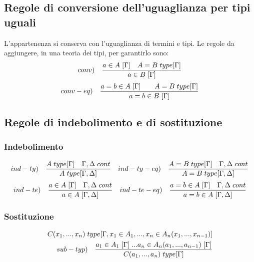 \subsection{Regole di conversione dell'uguaglianza per tipi uguali}
\label{subsec:conversione-uguaglianza}
L'appartenenza si conserva con l'uguaglianza di termini e tipi. Le regole da aggiungere, in una teoria dei tipi, per garantirlo sono:
\[ conv) \quad \frac{a \in A\hspace{0.1cm}[\Gamma] \quad A=B\hspace{0.1cm}type[\Gamma]}{a \in B\hspace{0.1cm}[\Gamma]} \]
\[ conv-eq) \quad \frac{a=b \in A\hspace{0.1cm}[\Gamma] \qquad A=B\hspace{0.1cm}type[\Gamma]}{a=b \in B\hspace{0.1cm}[\Gamma]} \]
\subsection{Regole di indebolimento e di sostituzione}
\label{subsec:indebolimento-sostituzione}
\subsubsection{Indebolimento}
\label{subsec:indebolimento}
\[ ind-ty) \quad \frac{A\hspace{0.1cm}type[\Gamma] \quad \Gamma,\Delta\hspace{0.1cm}cont}{A\hspace{0.1cm}type[\Gamma,\Delta]} \quad ind-ty-eq) \quad \frac{A=B\hspace{0.1cm}type[\Gamma] \quad \Gamma,\Delta\hspace{0.1cm}cont}{A=B\hspace{0.1cm}type[\Gamma,\Delta]} \]
\[ ind-te) \quad \frac{a \in A\hspace{0.1cm}[\Gamma] \quad \Gamma,\Delta\hspace{0.1cm}cont}{a \in A\hspace{0.1cm}[\Gamma,\Delta]} \quad ind-te-eq) \quad \frac{a=b \in A\hspace{0.1cm}
[\Gamma] \quad \Gamma,\Delta\hspace{0.1cm}cont}{a=b \in A\hspace{0.1cm}[\Gamma,\Delta]} \]
\subsubsection{Sostituzione}
\label{subsec:sostituzione}
\[
\begin{split}
C(x_1,...,x_n)\hspace{0.1cm}type[\Gamma, x_1 \in A_1,...,x_n \in A_n(x_1,...,x_{n-1})] \\ sub-typ) \quad \frac{a_1 \in A_1\hspace{0.1cm}[\Gamma]\hspace{0.1cm}...a_n \in A_n(a_1,...,a_{n-1})\hspace{0.1cm}[\Gamma]}{ C(a_1,...,a_n)\hspace{0.1cm}type[\Gamma]}
\end{split}
\]

